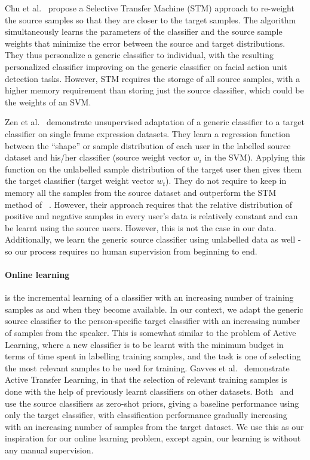 \documentclass[runningheads]{llncs}
\begin{document}
Chu et al.~\cite{Chu13} propose a Selective Transfer Machine (STM) approach to re-weight the source samples so that they are closer to the target samples. The algorithm simultaneously learns the parameters of the classifier and the source sample weights that minimize the error between the source and target distributions. They thus personalize a generic classifier to individual, with the resulting personalized classifier improving on the generic classifier on facial action unit detection tasks.
However, STM requires the storage of all source samples, with a higher memory requirement than storing just the source classifier, which could be the weights of an SVM.

Zen et al.~\cite{Zen14} demonstrate unsupervised adaptation of a generic classifier to a target classifier on single frame expression datasets. They learn a regression function between the ``shape'' or sample distribution of each user in the labelled source dataset and his/her classifier (source weight vector $w_i$ in the SVM). 
Applying this function on the unlabelled sample distribution of the target user then gives them the target classifier (target weight vector $w_t$). They do not require to keep in memory all the samples from the source dataset and outperform the STM method of ~\cite{Chu13}. However, their approach requires that the relative distribution of positive and negative samples in every user's data is relatively constant 
and can be learnt using the source users. However, this is not the case in our data. Additionally, we learn the generic source classifier using unlabelled data as well - so our process requires no human supervision from beginning to end.

\paragraph{Online learning} 
is the incremental learning of a classifier with an increasing number of training samples as and when they become available. In our context, we adapt the generic source classifier to the person-specific target classifier with an increasing number of samples from the speaker. This is somewhat similar to the problem of Active Learning, where a new classifier is to be learnt with the minimum budget in terms of time spent in labelling training samples, and the task is one of selecting the most relevant samples to be used for training. Gavves et al.~\cite{Gavves15} demonstrate Active Transfer Learning, in that the selection of relevant training samples is done with the help of previously learnt classifiers on other datasets. Both~\cite{Gavves15} and~\cite{Zen14} use the source classifiers as zero-shot priors, giving a baseline performance using only the target classifier, with classification performance gradually increasing with an increasing number of samples from the target dataset. We use this as our inspiration for our online learning problem, except again, our learning is without any manual supervision.
\end{document}
